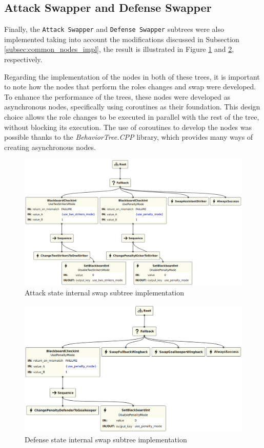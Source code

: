 \subsection{Attack Swapper and Defense Swapper}

Finally, the \texttt{Attack Swapper} and \texttt{Defense Swapper} subtrees were also implemented taking into account the modifications discussed in Subsection \ref{subsec:common_nodes_impl}, the result is illustrated in Figure \ref{fig:attack_swapper_impl} and \ref{fig:defense_swapper_impl}, respectively.

Regarding the implementation of the nodes in both of these trees, it is important to note how the nodes that perform the roles changes and swap were developed. To enhance the performance of the trees, these nodes were developed as asynchronous nodes, specifically using coroutines as their foundation. This design choice allows the role changes to be executed in parallel with the rest of the tree, without blocking its execution. The use of coroutines to develop the nodes was possible thanks to the \textit{BehaviorTree.CPP} library, which provides many ways of creating asynchronous nodes.

\begin{figure}[!h]
    \centering
    \includegraphics[width=1.0\linewidth]{images/implementation/AttackSwapper.png}
    \caption{Attack state internal swap subtree implementation}
    \label{fig:attack_swapper_impl}
\end{figure}

\begin{figure}[!h]
    \centering
    \includegraphics[width=1.0\linewidth]{images/implementation/DefenseSwapper.png}
    \caption{Defense state internal swap subtree implementation}
    \label{fig:defense_swapper_impl}
\end{figure}